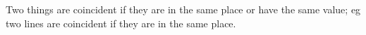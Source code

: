 Two things are coincident if they are in the same place
or have the same value; eg two lines are coincident if they
are in the same place.